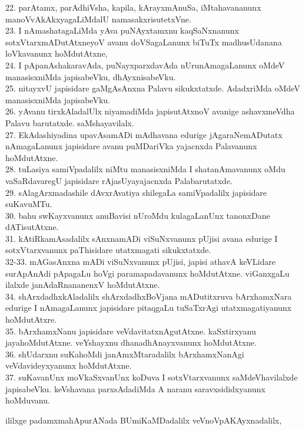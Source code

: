 \documentclass{article}
\begin{document}
22. parAtamx, parAdhiVsha, kapila, kArayxmAnuSa, iMtahavananunx manoVvAkAkxyagaLiMdalU namasakxrisutetxVne.\\
23. I nAmashatagaLiMda yAva puNAyxtamxnu kaqSaNxnanunx sotxVtarxmADutAtxneyoV avanu doVSagaLanunx biTuTx madhusUdanana loVkavanunx hoMdutAtxne,\\
24. I pApanAshakaravAda, puNayxparxdavAda nUrunAmagaLanunx oMdeV manasisxniMda japisabeVku, dhAyxnisabeVku.\\
25. nitayxvU japisidare gaMgAsAnxna Palavu sikukxtatxde. AdadxriMda oMdeV manasisxniMda japisabeVku.\\
26. yAvanu tirxkAladalUlx niyamadiMda japisutAtxnoV avanige ashavxmeVdha Palavu barutatxde. saMshayavilalx.\\
27. EkAdashiyadina upavAsamADi mAdhavana edurige jAgaraNemADutatx nAmagaLanunx japisidare avanu puMDariVka yajacnxda Palavanunx hoMdutAtxne.\\
28. tuLasiya samiVpadalilx niMtu manasisxniMda I shatanAmavanunx oMdu vaSaRdavaregU japisidare rAjasUyayajacnxda Palabarutatxde.\\
29. sAlagArxmadashile dAvxrAvatiya shilegaLa samiVpadalilx japisidare suKavuMTu.\\
30. bahu swKayxvanunx anuBavisi nUroMdu kulagaLanUnx tanonxDane dATisutAtxne.\\
31. kAtiRkamAsadalilx sAnxnamADi viSuNxvanunx pUjisi avana edurige I sotxVtarxvanunx paThisidare utatxmagati sikukxtatxde.\\
32-33. mAGasAnxna mADi viSuNxvanunx pUjisi, japisi athavA keVLidare surApAnAdi pApagaLu hoVgi paramapadavanunx hoMdutAtxne. viGanxgaLu ilalxde janAdaRnananenxV hoMdutAtxne.\\
34. shArxdadhxkAladalilx shArxdadhxBoVjana mADutitxruva bArxhamxNara edurige I nAmagaLanunx japisidare pitaqgaLu tuSaTxrAgi utatxmagatiyanunx hoMdutAtxre.\\
35. bArxhamxNanu japisidare veVdavitatxnAgutAtxne. kaSxtirxyanu jayahoMdutAtxne. veYshayxnu dhanadhAnayxvanunx hoMdutAtxne.\\
36. shUdarxnu suKahoMdi janAmxMtaradalilx bArxhamxNanAgi veVdavideyxyanunx hoMdutAtxne.\\
37. suKavanUnx moVkaSxvanUnx koDuva I sotxVtarxvanunx saMdeVhavilalxde japisabeVku. keVshavana parxsAdadiMda A naranu saravxsididxyanunx hoMduvanu.

\begin{center}
ililxge padamxmahApurANada BUmiKaMDadalilx veVnoVpAKAyxnadalilx,
\end{center}
\end{document}
